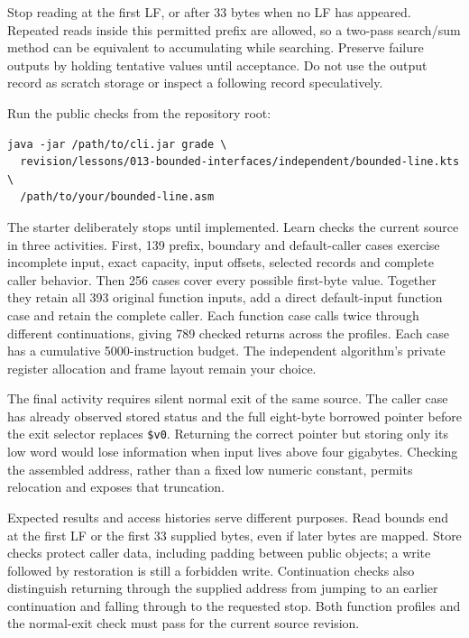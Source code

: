 Stop reading at the first LF, or after 33 bytes when no LF has appeared. Repeated
reads inside this permitted prefix are allowed, so a two-pass search/sum method
can be equivalent to accumulating while searching. Preserve failure outputs by
holding tentative values until acceptance. Do not use the output record as scratch
storage or inspect a following record speculatively.

\noindent\begin{minipage}{\linewidth}
  Run the public checks from the repository root:
  \begin{verbatim}
java -jar /path/to/cli.jar grade \
  revision/lessons/013-bounded-interfaces/independent/bounded-line.kts \
  /path/to/your/bounded-line.asm
\end{verbatim}
\end{minipage}\par\medskip

The starter deliberately stops until implemented. Learn checks the current
source in three activities. First, 139 prefix, boundary and default-caller cases
exercise incomplete input, exact capacity, input offsets, selected records and
complete caller behavior. Then 256 cases cover every possible first-byte value.
Together they retain all 393 original function inputs, add a direct default-input
function case and retain the complete caller. Each function case calls twice
through different continuations, giving 789 checked returns across the profiles.
Each case has a cumulative 5000-instruction budget. The independent algorithm's
private register allocation and frame layout remain your choice.

The final activity requires silent normal exit of the same source. The caller
case has already observed stored status and the full eight-byte borrowed pointer
before the exit selector replaces \texttt{\$v0}. Returning the correct pointer
but storing only its low word would lose information when input lives above
four gigabytes. Checking the assembled address, rather than a fixed low numeric
constant, permits relocation and exposes that truncation.

Expected results and access histories serve different purposes. Read bounds end
at the first LF or the first 33 supplied bytes, even if later bytes are mapped.
Store checks protect caller data, including padding between public objects; a
write followed by restoration is still a forbidden write. Continuation checks
also distinguish returning through the supplied address from jumping to an earlier
continuation and falling through to the requested stop. Both function profiles
and the normal-exit check must pass for the current source revision.

